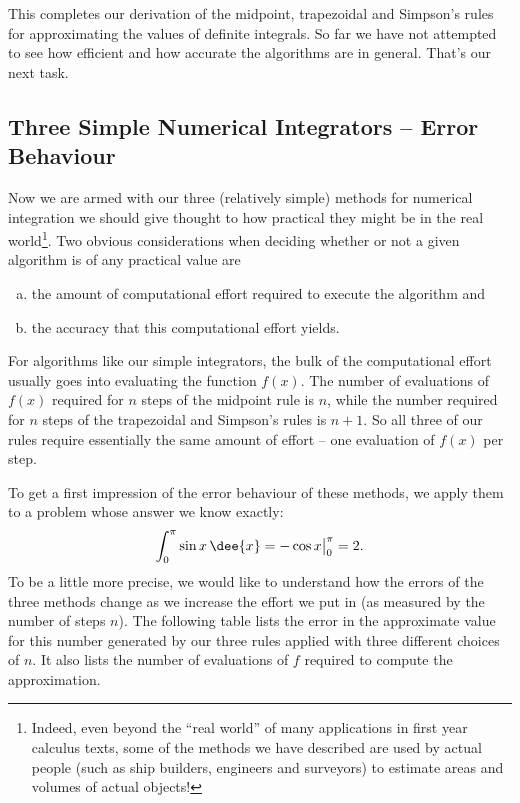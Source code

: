 This completes our derivation of the midpoint, trapezoidal and
Simpson's rules for approximating the values of definite integrals.
So far we have not  attempted to see how efficient and how accurate
the algorithms are in general. That's our next task.


\subsection{Three Simple Numerical Integrators -- Error Behaviour}\label{ssec num int err}
Now we are armed with our three (relatively simple) methods for numerical integration we
should give thought to how practical they might be in the real world\footnote{Indeed,
even beyond the ``real world'' of many applications in first year calculus texts, some of
the methods we have described are used by actual people (such as ship builders, engineers
and surveyors) to estimate areas and volumes of actual objects!}. Two obvious
considerations when deciding whether or not  a given algorithm is of
any practical value are
\begin{enumerate}[(a)]
\item the amount of computational effort required to execute the algorithm and
\item the accuracy that this computational effort yields.
\end{enumerate}
For algorithms like our simple integrators, the bulk of the computational effort usually
goes into evaluating the function $f(x)$. The number of evaluations of $f(x)$ required for
$n$ steps of the midpoint rule is $n$, while the number required for $n$ steps of the
trapezoidal and Simpson's rules is $n+1$. So all three of our rules require essentially
the same amount of effort -- one evaluation of $f(x)$ per step.

To get a first impression of the error behaviour of these methods, we apply them to a
problem whose answer we know exactly:
\begin{align*}
  \int_0^\pi\sin x\,\dee{x}=-\cos x\big|_0^\pi = 2.
\end{align*}
To be a little more precise, we would like to understand how the errors of the three
methods change as we increase the effort we put in (as measured by the number
of steps $n$). The following table lists the error in the approximate value
for this number generated by our three rules applied with three different
choices of $n$. It also lists the number of
evaluations of $f$ required to compute the approximation.

